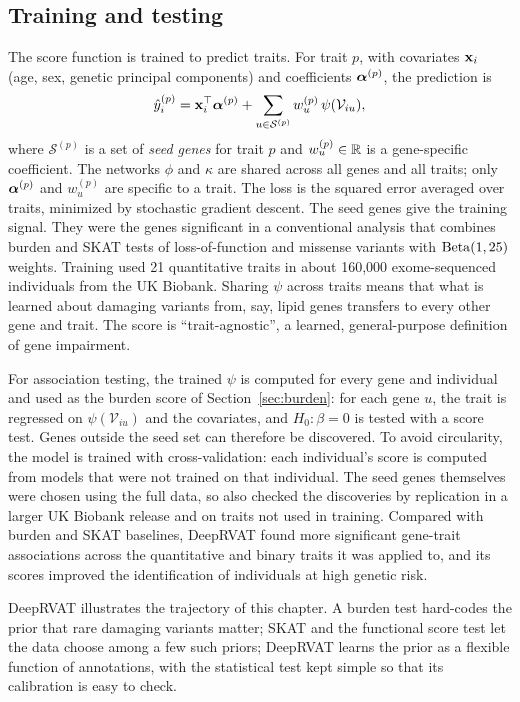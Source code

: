 \subsection{Training and testing}

The score function is trained to predict traits. For trait $p$, with covariates $\mathbf{x}_i$ (age, sex, genetic principal components) and coefficients $\boldsymbol{\alpha}^{(p)}$, the prediction is
\begin{equation}
  \hat y_i^{(p)} = \mathbf{x}_i^\top\boldsymbol{\alpha}^{(p)} + \sum_{u\in\mathcal{S}^{(p)}} w_u^{(p)}\,\psi(\mathcal{V}_{iu}),
\end{equation}
where $\mathcal{S}^{(p)}$ is a set of \emph{seed genes} for trait $p$ and $w_u^{(p)}\in\mathbb{R}$ is a gene-specific coefficient. The networks $\phi$ and $\kappa$ are shared across all genes and all traits; only $\boldsymbol{\alpha}^{(p)}$ and $w_u^{(p)}$ are specific to a trait. The loss is the squared error averaged over traits, minimized by stochastic gradient descent. The seed genes give the training signal. They were the genes significant in a conventional analysis that combines burden and SKAT tests of loss-of-function and missense variants with $\operatorname{Beta}(1,25)$ weights. Training used 21 quantitative traits in about 160,000 exome-sequenced individuals from the UK Biobank. Sharing $\psi$ across traits means that what is learned about damaging variants from, say, lipid genes transfers to every other gene and trait. The score is ``trait-agnostic'', a learned, general-purpose definition of gene impairment.

For association testing, the trained $\psi$ is computed for every gene and individual and used as the burden score of Section~\ref{sec:burden}: for each gene $u$, the trait is regressed on $\psi(\mathcal{V}_{iu})$ and the covariates, and $H_0:\beta=0$ is tested with a score test. Genes outside the seed set can therefore be discovered. To avoid circularity, the model is trained with cross-validation: each individual's score is computed from models that were not trained on that individual. The seed genes themselves were chosen using the full data, so \citet{clarke2024} also checked the discoveries by replication in a larger UK Biobank release and on traits not used in training. Compared with burden and SKAT baselines, DeepRVAT found more significant gene-trait associations across the quantitative and binary traits it was applied to, and its scores improved the identification of individuals at high genetic risk.

DeepRVAT illustrates the trajectory of this chapter. A burden test hard-codes the prior that rare damaging variants matter; SKAT and the functional score test let the data choose among a few such priors; DeepRVAT learns the prior as a flexible function of annotations, with the statistical test kept simple so that its calibration is easy to check.

